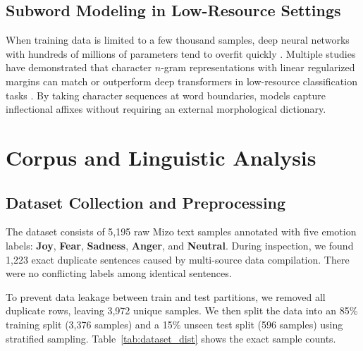 \documentclass[conference]{IEEEtran}
\begin{document}
\subsection{Subword Modeling in Low-Resource Settings}
When training data is limited to a few thousand samples, deep neural networks with hundreds of millions of parameters tend to overfit quickly \cite{sennrich2016neural}. Multiple studies have demonstrated that character $n$-gram representations with linear regularized margins can match or outperform deep transformers in low-resource classification tasks \cite{joulin2017bag, bojanowski2017enriching}. By taking character sequences at word boundaries, models capture inflectional affixes without requiring an external morphological dictionary.

\section{Corpus and Linguistic Analysis}

\subsection{Dataset Collection and Preprocessing}
The dataset consists of 5,195 raw Mizo text samples annotated with five emotion labels: \textbf{Joy}, \textbf{Fear}, \textbf{Sadness}, \textbf{Anger}, and \textbf{Neutral}. During inspection, we found 1,223 exact duplicate sentences caused by multi-source data compilation. There were no conflicting labels among identical sentences. 

To prevent data leakage between train and test partitions, we removed all duplicate rows, leaving 3,972 unique samples. We then split the data into an 85\% training split (3,376 samples) and a 15\% unseen test split (596 samples) using stratified sampling. Table~\ref{tab:dataset_dist} shows the exact sample counts.

\begin{table}[htbp]
\caption{Class Distribution of the Mizo Emotion Corpus}
\label{tab:dataset_dist}
\centering
{}
\end{table}
\end{document}
